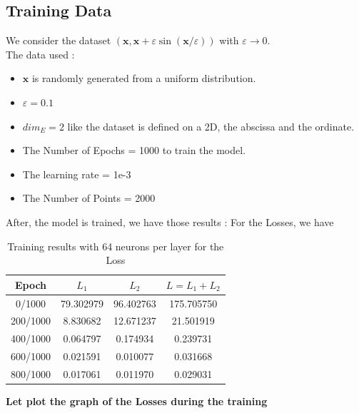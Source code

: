 \documentclass{report}
\begin{document}
    \subsection{Training Data}

        We consider the dataset $(\mathbf{x}, \mathbf{x}+\varepsilon \sin (\mathbf{x} / \varepsilon))$ with $\varepsilon \rightarrow 0$.
        \\
        The data used :
        \begin{itemize}
            \item $\mathbf{x}$ is randomly generated from a uniform distribution.
            \item $\varepsilon = 0.1$
            \item  $dim_E = 2$ like the dataset is defined on a 2D, 
            the abscissa and the ordinate.
            \item The Number of Epochs = 1000  to train the model.
            \item The learning rate = 1e-3
            \item The Number of Points = 2000
        \end{itemize}


        After, the model is trained, we have those results :
        For the Losses, we have 
        \begin{table}[h]
            \centering
            \begin{tabular}{|c|c|c|c|}
            \hline

            Epoch & $L_{1}$ & $L_{2}$ & $L = L_{1} + L_{2}$ \\

            \hline
            0/1000 & 79.302979 & 96.402763 & 175.705750 \\
            200/1000 & 8.830682 & 12.671237 & 21.501919 \\
            400/1000 & 0.064797 & 0.174934 & 0.239731 \\
            600/1000 & 0.021591 & 0.010077 & 0.031668 \\
            800/1000 & 0.017061 & 0.011970 & 0.029031 \\
            \hline
            \end{tabular}
            \caption{Training results with 64 neurons per layer for the Loss}

        \end{table}

        \textbf{Let plot the graph of the Losses during the training}
\end{document}
